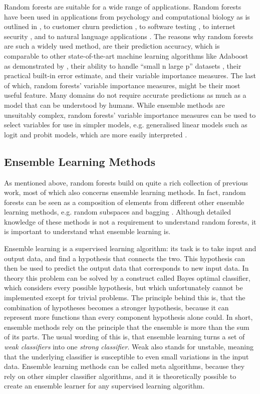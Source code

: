 \documentclass[a4paper,man,12pt,apacite,floatsintext]{apa6} %
\begin{document}
Random forests are suitable for a wide range of applications.
Random forests have been used in applications from psychology and
computational biology as is outlined in ,
to customer churn prediction \cite{xie2009customer},
to software testing \cite{guo2004robust}, to internet security
\cite{zhang2005network}, and to natural language applications
\cite{xu2004random, kobylinski2008definition}.
The reasons why random forests are such a widely used method,
are their prediction accuracy, which is comparable to other state-of-the-art
machine learning algorithms like Adaboost as demonstrated
by ,
their ability to handle “small n large p” datasets \cite{strobl2009introduction},
their practical built-in error estimate, and their variable importance measures.
The last of which, random forests' variable importance measures,
might be their most useful feature.
Many domains do not require accurate predictions as much as a model that can
be understood by humans.
While ensemble methods are unsuitably complex,
random forests' variable importance measures can be used to select variables
for use in simpler models, e.g.
generalised linear models such as logit and probit models,
which are more easily interpreted \cite{strobl2009introduction}.

\subsection{Ensemble Learning Methods}
As mentioned above, random forests build on quite a rich collection of
previous work, most of which also concerns ensemble learning methods.
In fact, random forests can be seen as a composition of elements from
different other ensemble learning methods, e.g.
random subspaces \cite{ho1998random} and bagging \cite{breiman1996bagging}.
Although detailed knowledge of these methods is not a requirement to
understand random forests, it is important to understand what
ensemble learning is.

Ensemble learning is a supervised learning algorithm: its task is to take
input and output data, and find a hypothesis that connects
the two.
This hypothesis can then be used to predict the output data that
corresponds to new input data.
In theory this problem can be solved by a construct called
Bayes optimal classifier, which considers every possible hypothesis,
but which unfortunately cannot be implemented except for trivial problems.
The principle behind this is, that the combination of hypotheses becomes
a stronger hypothesis, because it can represent more functions
than every component hypothesis alone could.
In short, ensemble methods rely on the principle that the ensemble is more
than the sum of its parts.
The usual wording of this is, that ensemble learning turns a set of
\emph{weak classifiers} into one \emph{strong classifier}.
Weak also stands for unstable, meaning that the underlying classifier is
susceptible to even small variations in the input data.
Ensemble learning methods can be called meta algorithms,
because they rely on other simpler classifier algorithms,
and it is theoretically possible to create an ensemble learner for any
supervised learning algorithm. \cite{wpEL, Polikar:2009}
\end{document}
